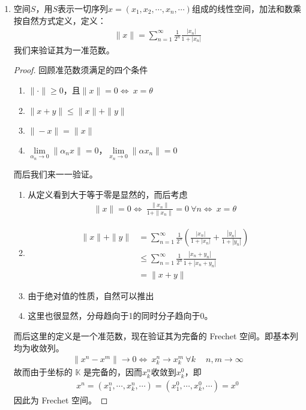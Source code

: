 \begin{enumerate}[leftmargin=2cm, label=\arabic*]
    \item 空间$S$，用$S$表示一切序列$x = (x_1,x_2,\cdots,x_n,\cdots)$组成的线性空间，加法和数乘按自然方式定义，定义：
    \begin{align*}
        \|x\| = \sum\limits_{n=1}^{\infty} \frac{1}{2^n} \frac{|x_n|}{1+|x_n|}
    \end{align*}
    我们来验证其为一准范数。
    \begin{proof}
        回顾准范数须满足的四个条件
        \begin{enumerate}[leftmargin=1cm, label=(\arabic*)]
            \item $\|\cdot\|\geqslant 0$，且$\|x\| = 0\Leftrightarrow\ x = \theta$
            \item $\|x + y\| \leqslant \|x\| + \|y\|$
            \item $\|-x\| = \|x\|$
            \item $\lim\limits_{\alpha_n\to 0}\|\alpha_n x\| = 0$，$\lim\limits_{x_n\to 0} \|\alpha x_n\| = 0$
        \end{enumerate}
        而后我们来一一验证。
        \begin{enumerate}[leftmargin=1cm, label=(\arabic*)]
            \item 从定义看到大于等于零是显然的，而后考虑
            \begin{align*}
                \|x\| = 0 \Leftrightarrow\ \frac{\|x_n\|}{1+\|x_n\|} = 0\ \forall n \Leftrightarrow\ x = \theta
            \end{align*}
            \item 
            \begin{align*}
                \|x\| + \|y\| &= \sum\limits_{n=1}^{\infty} \frac{1}{2^n} \left( \frac{|x_n|}{1+|x_n|} + \frac{|y_n|}{1+|y_n|}\right) \\
                & \leqslant \sum\limits_{n=1}^{\infty} \frac{1}{2^n} \frac{|x_n + y_n|}{1 + |x_n + y_n|} \\
                & = \|x + y\|
            \end{align*}
            \item 由于绝对值的性质，自然可以推出
            \item 这里也很显然，分母趋向于1的同时分子趋向于0。
        \end{enumerate}
        而后这里的定义是一个准范数，现在验证其为完备的 Frechet 空间。即基本列均为收敛列。
        \begin{align*}
            \|x^n - x^m\| \to 0 \Leftrightarrow\ x^n_k \to x^m_k\ \forall k\ \quad n,m\to\infty
        \end{align*}
        故而由于坐标的 $\mathbb{K}$ 是完备的，因而$x^n_k$收敛到$x^0_k$，即
        \begin{align*}
            x^n = \left(x^n_1,\cdots, x^n_k,\cdots \right) = \left(x^0_1,\cdots,x^0_k,\cdots \right) = x^0
        \end{align*}
        因此为 Frechet 空间。
    \end{proof}



\end{enumerate}
